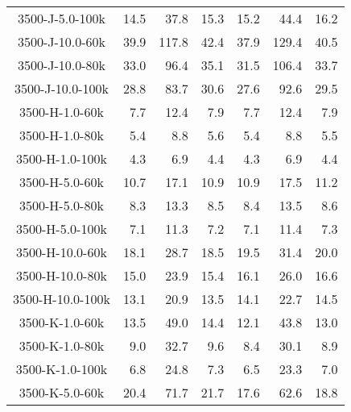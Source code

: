 \begin{longtable}{crrrrrr}
      3500-J-5.0-100k &        14.5 &        37.8 &        15.3 &           15.2 &           44.4 &           16.2 \\
      3500-J-10.0-60k &        39.9 &       117.8 &        42.4 &           37.9 &          129.4 &           40.5 \\
      3500-J-10.0-80k &        33.0 &        96.4 &        35.1 &           31.5 &          106.4 &           33.7 \\
      3500-J-10.0-100k &        28.8 &        83.7 &        30.6 &           27.6 &           92.6 &           29.5 \\
      3500-H-1.0-60k &         7.7 &        12.4 &         7.9 &            7.7 &           12.4 &            7.9 \\
      3500-H-1.0-80k &         5.4 &         8.8 &         5.6 &            5.4 &            8.8 &            5.5 \\
      3500-H-1.0-100k &         4.3 &         6.9 &         4.4 &            4.3 &            6.9 &            4.4 \\
      3500-H-5.0-60k &        10.7 &        17.1 &        10.9 &           10.9 &           17.5 &           11.2 \\
      3500-H-5.0-80k &         8.3 &        13.3 &         8.5 &            8.4 &           13.5 &            8.6 \\
      3500-H-5.0-100k &         7.1 &        11.3 &         7.2 &            7.1 &           11.4 &            7.3 \\
      3500-H-10.0-60k &        18.1 &        28.7 &        18.5 &           19.5 &           31.4 &           20.0 \\
      3500-H-10.0-80k &        15.0 &        23.9 &        15.4 &           16.1 &           26.0 &           16.6 \\
      3500-H-10.0-100k &        13.1 &        20.9 &        13.5 &           14.1 &           22.7 &           14.5 \\
      3500-K-1.0-60k &        13.5 &        49.0 &        14.4 &           12.1 &           43.8 &           13.0 \\
      3500-K-1.0-80k &         9.0 &        32.7 &         9.6 &            8.4 &           30.1 &            8.9 \\
      3500-K-1.0-100k &         6.8 &        24.8 &         7.3 &            6.5 &           23.3 &            7.0 \\
      3500-K-5.0-60k &        20.4 &        71.7 &        21.7 &           17.6 &           62.6 &           18.8 \\

\end{longtable}
